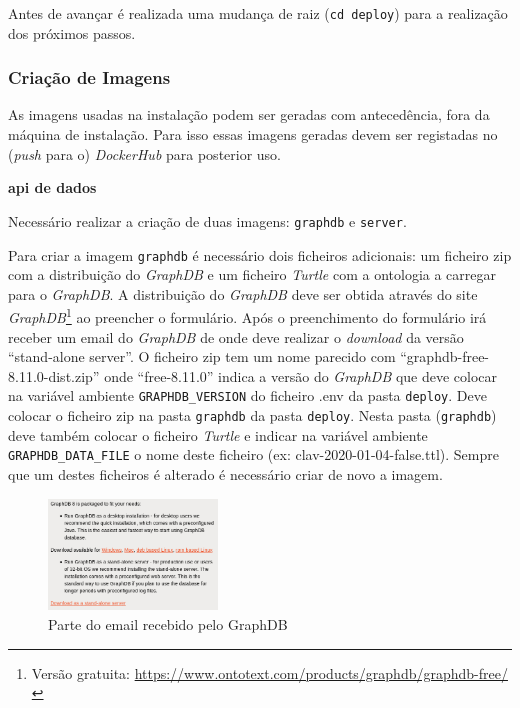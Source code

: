 Antes de avançar é realizada uma mudança de raiz (\verb|cd deploy|) para a realização dos próximos passos.

\subsubsection{Criação de Imagens}\label{sec:int-imagens}

As imagens usadas na instalação podem ser geradas com antecedência, fora da máquina de instalação. Para isso essas imagens geradas devem ser registadas no (\textit{push} para o) \textit{DockerHub} para posterior uso.

\begin{description}
    \item \textbf{\acrshort{api} de dados}

    Necessário realizar a criação de duas imagens: \texttt{graphdb} e \texttt{server}.

    Para criar a imagem \texttt{graphdb} é necessário dois ficheiros adicionais: um ficheiro zip com a distribuição do \textit{GraphDB} e um ficheiro \textit{Turtle} com a ontologia a carregar para o \textit{GraphDB}. A distribuição do \textit{GraphDB} deve ser obtida através do site \textit{GraphDB}\footnote{Versão gratuita: \url{https://www.ontotext.com/products/graphdb/graphdb-free/}} ao preencher o formulário. Após o preenchimento do formulário irá receber um email do \textit{GraphDB} de onde deve realizar o \textit{download} da versão ``stand-alone server''. O ficheiro zip tem um nome parecido com ``graphdb-free-8.11.0-dist.zip'' onde ``free-8.11.0'' indica a versão do \textit{GraphDB} que deve colocar na variável ambiente \texttt{GRAPHDB\_VERSION} do ficheiro .env da pasta \texttt{deploy}. Deve colocar o ficheiro zip na pasta \texttt{graphdb} da pasta \texttt{deploy}. Nesta pasta (\texttt{graphdb}) deve também colocar o ficheiro \textit{Turtle} e indicar na variável ambiente \texttt{GRAPHDB\_DATA\_FILE} o nome deste ficheiro (ex: clav-2020-01-04-false.ttl). Sempre que um destes ficheiros é alterado é necessário criar de novo a imagem.

    \begin{figure}[H]
        \begin{center}
        \includegraphics[width=0.4\textwidth]{img/graphdb_email.png}
        \end{center}
        \caption{Parte do email recebido pelo GraphDB\label{fig:instalacao-email}}
    \end{figure}


\end{description}
